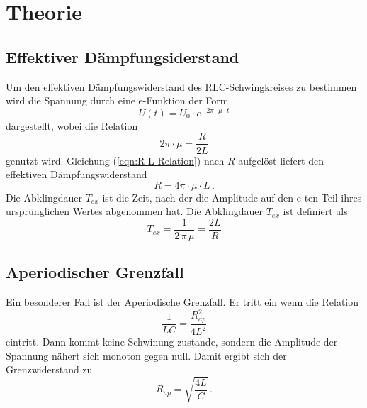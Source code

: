 \section{Theorie}
\label{sec:Theorie}
    \subsection{Effektiver Dämpfungsiderstand}
        Um den effektiven Dämpfungswiderstand des RLC-Schwingkreises zu bestimmen wird die Spannung durch eine e-Funktion der Form
        \begin{equation}
            \label{eqn:e-spannung}
            U(t)=U_0 \cdot e^{-2 \pi \cdot \mu \cdot t}
        \end{equation}
        dargestellt, wobei die Relation 
        \begin{equation}
            \label{eqn:R-L-Relation}
            2 \pi \cdot \mu = \frac{R}{2L}
        \end{equation}
        genutzt wird. Gleichung (\ref{eqn:R-L-Relation}) nach $R$ aufgelöst liefert den effektiven Dämpfungswiderstand
        \begin{equation}
            \label{eqn:R_eff}
            R = 4 \pi \cdot \mu \cdot L \, .
        \end{equation}
        Die Abklingdauer $T_{ex}$ ist die Zeit, nach der die Amplitude auf den e-ten Teil ihres ursprünglichen Wertes abgenommen hat. Die Abklingdauer $T_{ex}$ ist definiert als
        \begin{equation}
            \label{eqn:T_ex}
            T_{ex}=\frac{1}{2 \, \pi \, \mu} = \frac{2L}{R}
        \end{equation}
    \subsection{Aperiodischer Grenzfall}
        Ein besonderer Fall ist der Aperiodische Grenzfall. Er tritt ein wenn die Relation
        \begin{equation*}
            \frac{1}{LC}= \frac{R_{ap}^2}{4L^2}
        \end{equation*}
        eintritt. Dann kommt keine Schwinung zustande, sondern die Amplitude der Spannung nähert sich monoton gegen null. Damit ergibt sich der Grenzwiderstand zu 
        \begin{equation}
            \label{eqn:grenzwiderstand}
            R_{ap}= \sqrt{\frac{4L}{C}} \, .
        \end{equation}
